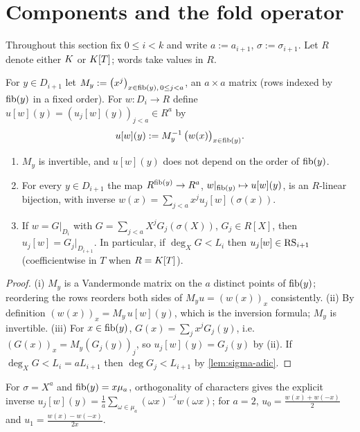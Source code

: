 \section{Components and the fold operator}

Throughout this section fix $0\le i<k$ and write $a:=a_{i+1}$, $\sigma:=\sigma_{i+1}$. Let
$R$ denote either $K$ or $K[T]$; words take values in $R$.

\begin{definition}[Components]\label{def:components}
For $y\in D_{i+1}$ let $M_y:=\bigl(x^j\bigr)_{x\in\mathrm{fib}(y),\,0\le j<a}$, an $a\times a$
matrix (rows indexed by $\mathrm{fib}(y)$ in a fixed order). For $w:D_i\to R$ define
$u[w](y)=(u_j[w](y))_{j<a}\in R^a$ by
\[
u[w](y):=M_y^{-1}\,\bigl(w(x)\bigr)_{x\in\mathrm{fib}(y)} .
\]
\end{definition}

\begin{lemma}[Components]\label{lem:components}
\begin{enumerate}[label=\textup{(\roman*)}]
\item $M_y$ is invertible, and $u[w](y)$ does not depend on the order of $\mathrm{fib}(y)$.
\item For every $y\in D_{i+1}$ the map
$R^{\mathrm{fib}(y)}\to R^a$, $w|_{\mathrm{fib}(y)}\mapsto u[w](y)$, is an $R$-linear bijection, with
inverse $w(x)=\sum_{j<a}x^ju_j[w](\sigma(x))$.
\item If $w=G|_{D_i}$ with $G=\sum_{j<a}X^jG_j(\sigma(X))$, $G_j\in R[X]$, then
$u_j[w]=G_j|_{D_{i+1}}$. In particular, if $\deg_XG<L_i$ then $u_j[w]\in\mathrm{RS}_{i+1}$
\textup{(}coefficientwise in $T$ when $R=K[T]$\textup{)}.
\end{enumerate}
\end{lemma}

\begin{proof}
(i) $M_y$ is a Vandermonde matrix on the $a$ distinct points of $\mathrm{fib}(y)$; reordering the
rows reorders both sides of $M_yu=(w(x))_x$ consistently.
(ii) By definition $(w(x))_x=M_y\,u[w](y)$, which is the inversion formula; $M_y$ is
invertible.
(iii) For $x\in\mathrm{fib}(y)$, $G(x)=\sum_jx^jG_j(y)$, i.e.\ $(G(x))_x=M_y(G_j(y))_j$, so
$u_j[w](y)=G_j(y)$ by (ii). If $\deg_XG<L_i=aL_{i+1}$ then $\deg G_j<L_{i+1}$ by
\cref{lem:sigma-adic}.
\end{proof}

\begin{remark}\label{rem:dft}
For $\sigma=X^a$ and $\mathrm{fib}(y)=x\mu_a$, orthogonality of characters gives the explicit
inverse $u_j[w](y)=\frac1a\sum_{\omega\in\mu_a}(\omega x)^{-j}w(\omega x)$; for $a=2$,
$u_0=\frac{w(x)+w(-x)}2$ and $u_1=\frac{w(x)-w(-x)}{2x}$.
\end{remark}

